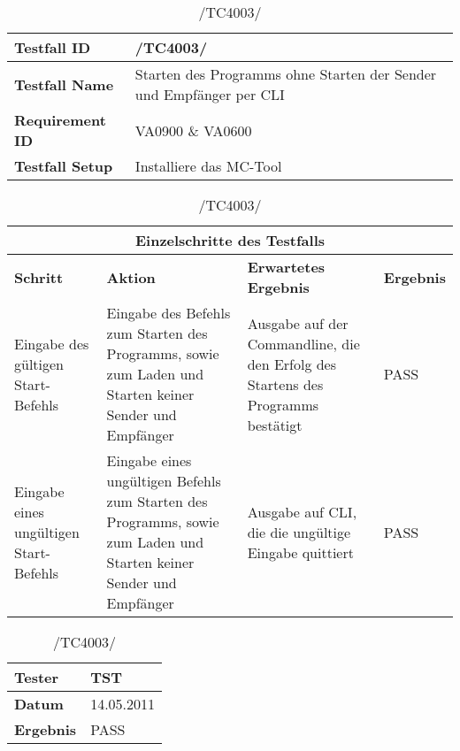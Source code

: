 \begin{table}[h]
    \caption{/TC4003/}
    \label{tab:TC4003}
    \begin{center}
        \begin{tabular}{|p{3.5cm}|p{11cm}|}
            \hline
                \textbf{Testfall ID} & /TC4003/\\
            \hline
                \textbf{Testfall Name} & Starten des Programms ohne Starten der
                Sender und Empfänger per CLI \\
            \hline
                \textbf{Requirement ID} & VA0900 \& VA0600\\
            \hline
                \textbf{Testfall Setup} & Installiere das MC-Tool\\
            \hline
        \end{tabular}
        \begin{tabular}{|p{2cm}|p{3.9cm}|p{3.9cm}|p{3.8cm}|}
            \multicolumn{4}{|c|}{\textbf{Einzelschritte des Testfalls}} \\
            \hline
                \textbf{Schritt} & \textbf{Aktion} & \textbf{Erwartetes
                Ergebnis} & \textbf{Ergebnis}\\
            \hline
                Eingabe des gültigen Start-Befehls & Eingabe des Befehls zum
                Starten des Programms, sowie zum Laden und Starten keiner Sender
                und Empfänger & Ausgabe auf der Commandline, die den Erfolg des
                Startens des Programms bestätigt & PASS\\
            \hline
                Eingabe eines ungültigen Start-Befehls & Eingabe eines ungültigen
                Befehls zum Starten des Programms, sowie zum Laden und Starten
                keiner Sender und Empfänger & Ausgabe auf CLI, die die ungültige
                Eingabe quittiert & PASS \\
            \hline
        \end{tabular}
        \begin{tabular}{|p{3.5cm}|p{11cm}|}
                \textbf{Tester} & TST\\
            \hline
                \textbf{Datum} & 14.05.2011\\
            \hline
                \textbf{Ergebnis} & PASS\\
            \hline
        \end{tabular}
    \end{center}
\end{table}

